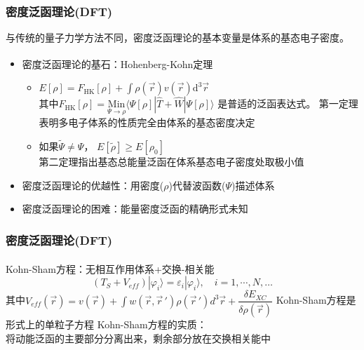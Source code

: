 \documentclass[cjk,slidestop,compress,mathserif,blue]{beamer}
\newcommand{\upcite}[1]{\hspace{0ex}\textsuperscript{\cite{#1}}} %
\begin{document}
\frame                               %
{
\frametitle{密度泛函理论(\textrm{DFT})} %
与传统的量子力学方法不同，密度泛函理论的基本变量是体系的基态电子密度。%
\begin{itemize}%
	\item 密度泛函理论的基石：\textrm{Hohenberg-Kohn}定理\upcite{PR136-B864_1964}
\vskip 5pt
\begin{itemize}%
   \setlength{\itemsep}{8pt}
 \item $E[\rho]=F_{\mathrm{HK}}[\rho]+\displaystyle\int\rho(\vec{r})v(\vec{r})\textrm{d}^{3}\vec{r}$ \\
\vskip 5pt 其中$F_{\mathrm{HK}}[\rho]=\underset{\Psi\to\rho}{\mathrm{Min}}\langle\Psi[\rho]|\hat{T}+\hat{W}|\Psi[\rho]\rangle$
是普适的泛函表达式。%
     \textrm{\small{第一定理表明多电子体系的性质完全由体系的基态密度决定}}
   \item 如果$\tilde\Psi\neq\Psi$，
     $E[\tilde\rho]\geqslant E[\rho_0]$\\
     \textrm{\small{第二定理指出基态总能量泛函在体系基态电子密度处取极小值}}
   \end{itemize}
\vskip 8pt
 \item 密度泛函理论的优越性：用密度($\rho$)代替波函数($\Psi$)描述体系
\vskip 5pt
 \item 密度泛函理论的困难：能量密度泛函的精确形式未知
   \end{itemize}
}
\frame                               %
{
\frametitle{密度泛函理论(\textrm{DFT})}
\textrm{Kohn-Sham}方程\upcite{PR140-A1133_1965}：无相互作用体系+交换-相关能
$$(T_S+V_{e\!f\!f})|\varphi_i\rangle=\varepsilon_i|\varphi_i\rangle,\quad i=1,\cdots,N,\dots$$
其中$V_{e\!f\!f}(\vec r)=v(\vec r)+\displaystyle\int w(\vec r,\vec r\,')\rho(\vec r\,')d^3\vec r+\dfrac{\delta E_{XC}}{\delta\rho(\vec r)}$
\vskip 10pt
\textrm{Kohn-Sham}方程是形式上的单粒子方程
\vskip 20pt
\textrm{Kohn-Sham}方程的实质：\\将动能泛函的主要部分分离出来，剩余部分放在交换相关能中
}
\frame                               %
\end{document}
